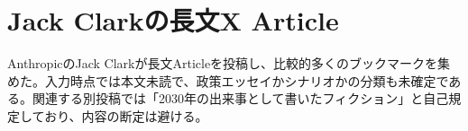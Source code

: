 \section{Jack Clarkの長文X Article}
AnthropicのJack Clarkが長文Articleを投稿し、比較的多くのブックマークを集めた。入力時点では本文未読で、政策エッセイかシナリオかの分類も未確定である。関連する別投稿では「2030年の出来事として書いたフィクション」と自己規定しており、内容の断定は避ける。
